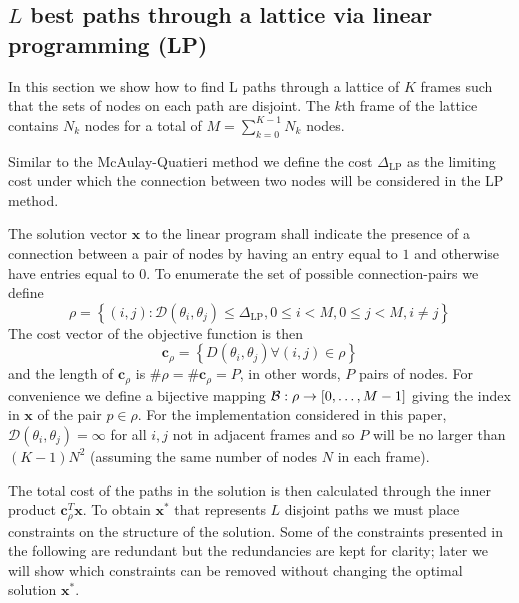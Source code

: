 \documentclass{article}
\newcommand{\cLP}{\boldsymbol{c}_{\rho}}
\newcommand{\BS}[1]{\boldsymbol{#1}}
\begin{document}
\begin{sloppy}
\section{$L$ best paths through a lattice via linear programming (LP)}

In this section we show how to find L paths through a lattice of $K$ frames such
that the sets of nodes on each path are disjoint. The $k$th frame of the lattice
contains $N_{k}$ nodes for a total of $M = \sum_{k=0}^{K-1}N_{k}$ nodes.

Similar to the McAulay-Quatieri method 
we define the cost $\Delta_{\text{LP}}$ as the limiting cost under which the
connection between two nodes will be considered in the LP method.

The solution vector $\BS{x}$ to the linear program shall indicate the presence of a
connection between a pair of nodes by having an entry equal to $1$ and otherwise
have entries equal to $0$. To enumerate the set of possible connection-pairs we
define
\begin{equation}
    \rho = \left\{ (i,j) : \mathcal{D}(\theta_{i},\theta_{j}) \leq
    \Delta_{\text{LP}} , 0 \leq i < M, 0 \leq j < M, i \neq j \right\}
\end{equation}
The cost vector of the objective function is then 
\begin{equation}
    \cLP = \left\{ D(\theta_{i},\theta_{j}) \forall (i,j) \in
    \rho \right\}
\end{equation}
and the length of $\cLP$ is $\# \rho = \# \cLP = P$, in other words, $P$
pairs of nodes. For convenience we define a bijective mapping ${\mathcal{B} :
\rho \rightarrow [0, \mathellipsis, M-1]}$ giving the index in $\BS{x}$ of the
pair $p \in \rho$. For the implementation considered in this paper,
$\mathcal{D}(\theta_{i},\theta_{j}) = \infty$ for all $i,j$ not in adjacent
frames and so $P$ will be no larger than $(K-1)N^{2}$ (assuming the same
number of nodes $N$ in each frame).

The total cost of the paths in the solution is then calculated through the
inner product $\cLP^{T}\BS{x}$. To obtain $\BS{x}^{\ast}$ that represents $L$
disjoint paths we must place constraints on the structure of the solution. Some
of the constraints presented in the following are redundant but the redundancies
are kept for clarity; later we will show which constraints can be removed
without changing the optimal solution $\BS{x}^{\ast}$.


\end{sloppy}
\end{document}
